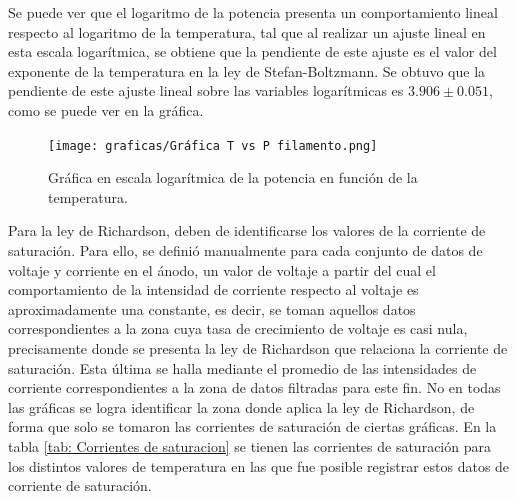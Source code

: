 \documentclass[%
 reprint,
 amsmath,amssymb,
 aps,
]{revtex4-2}
\begin{document}
\vspace{0.2 cm}
Se puede ver que el logaritmo de la potencia presenta un comportamiento lineal respecto al logaritmo de la temperatura, tal que al realizar un ajuste lineal en esta escala logarítmica, se obtiene que la pendiente de este ajuste es el valor del exponente de la temperatura en la ley de Stefan-Boltzmann. Se obtuvo que la pendiente de este ajuste lineal sobre las variables logarítmicas es $3.906 \pm 0.051$, como se puede ver en la gráfica.

\begin{figure}[H]
    \centering
    \texttt{[image: graficas/Gráfica T vs P filamento.png]}
    \caption{Gráfica en escala logarítmica de la potencia en función de la temperatura.}
    \label{fig: Gráfica T vs P filamento}
\end{figure}

\vspace{0.2 cm}
Para la ley de Richardson, deben de identificarse los valores de la corriente de saturación. Para ello, se definió manualmente para cada conjunto de datos de voltaje y corriente en el ánodo, un valor de voltaje a partir del cual el comportamiento de la intensidad de corriente respecto al voltaje es aproximadamente una constante, es decir, se toman aquellos datos correspondientes a la zona cuya tasa de crecimiento de voltaje es casi nula, precisamente donde se presenta la ley de Richardson que relaciona la corriente de saturación. Esta última se halla mediante el promedio de las intensidades de corriente correspondientes a la zona de datos filtradas para este fin. No en todas las gráficas se logra identificar la zona donde aplica la ley de Richardson, de forma que solo se tomaron las corrientes de saturación de ciertas gráficas. En la tabla \ref{tab: Corrientes de saturacion} se tienen las corrientes de saturación para los distintos valores de temperatura en las que fue posible registrar estos datos de corriente de saturación. 
\end{document}
